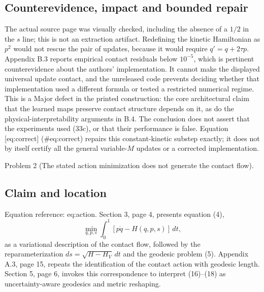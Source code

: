 \documentclass[10pt]{article}
\begin{document}
\subsection*{Counterevidence, impact and bounded repair}
The actual source page was visually checked, including the absence of a \(1/2\) in the \(s\) line; this is not an extraction artifact. Redefining the kinetic Hamiltonian as \(p^2\) would not rescue the pair of updates, because it would require \(q'=q+2\tau p\). Appendix B.3 reports empirical contact residuals below \(10^{-5}\), which is pertinent counterevidence about the authors’ implementation. It cannot make the displayed universal update contact, and the unreleased code prevents deciding whether that implementation used a different formula or tested a restricted numerical regime. This is a Major defect in the printed construction: the core architectural claim that the learned maps preserve contact structure depends on it, as do the physical-interpretability arguments in B.4. The conclusion does not assert that the experiments used (33c), or that their performance is false. Equation [eq:correct] (\#eq:correct) repairs this constant-kinetic substep exactly; it does not by itself certify all the general variable-\(M\) updates or a corrected implementation.\par
Problem 2 (The stated action minimization does not generate the contact flow).\par
\subsection*{Claim and location}
Equation reference: eq:action. Section 3, page 4, presents equation (4), \[
 \min_{q,p,s}\int_0^1[p\dot q-H(q,p,s)]\,dt,\] as a variational description of the contact flow, followed by the reparameterization \(ds=\sqrt{H-H_V}\,dt\) and the geodesic problem (5). Appendix A.3, page 15, repeats the identification of the contact action with geodesic length. Section 5, page 6, invokes this correspondence to interpret (16)–(18) as uncertainty-aware geodesics and metric reshaping.\par
\end{document}

